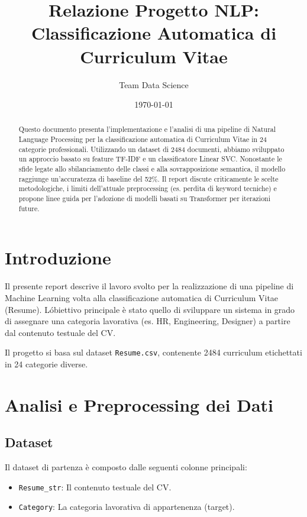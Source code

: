 \documentclass[a4paper,12pt]{article}
\title{\textbf{Relazione Progetto NLP: Classificazione Automatica di Curriculum Vitae}}
\author{Team Data Science}
\date{\today}
\begin{document}
\maketitle

\tableofcontents
\newpage

\begin{abstract}
Questo documento presenta l'implementazione e l'analisi di una pipeline di Natural Language Processing per la classificazione automatica di Curriculum Vitae in 24 categorie professionali. Utilizzando un dataset di 2484 documenti, abbiamo sviluppato un approccio basato su feature TF-IDF e un classificatore Linear SVC. Nonostante le sfide legate allo sbilanciamento delle classi e alla sovrapposizione semantica, il modello raggiunge un'accuratezza di baseline del 52\%. Il report discute criticamente le scelte metodologiche, i limiti dell'attuale preprocessing (es. perdita di keyword tecniche) e propone linee guida per l'adozione di modelli basati su Transformer per iterazioni future.
\end{abstract}

\section{Introduzione}
Il presente report descrive il lavoro svolto per la realizzazione di una pipeline di Machine Learning volta alla classificazione automatica di Curriculum Vitae (Resume). L\'obiettivo principale è stato quello di sviluppare un sistema in grado di assegnare una categoria lavorativa (es. HR, Engineering, Designer) a partire dal contenuto testuale del CV.

Il progetto si basa sul dataset \texttt{Resume.csv}, contenente 2484 curriculum etichettati in 24 categorie diverse.

\section{Analisi e Preprocessing dei Dati}

\subsection{Dataset}
Il dataset di partenza è composto dalle seguenti colonne principali:
\begin{itemize}
    \item \texttt{Resume\_str}: Il contenuto testuale del CV.
    \item \texttt{Category}: La categoria lavorativa di appartenenza (target).
\end{itemize}
\end{document}
